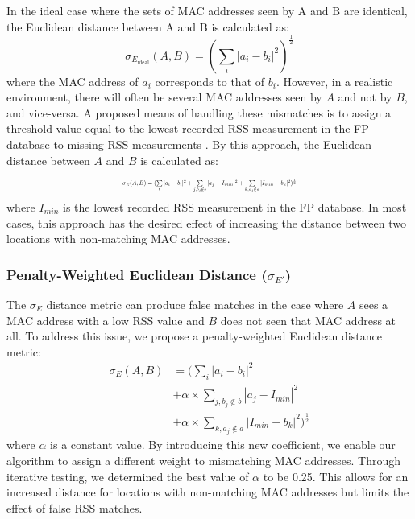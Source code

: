 \documentclass[conference]{IEEEtran}
\begin{document}
\indent In the ideal case where the sets of MAC addresses seen by A and B are identical, the Euclidean distance between A and B is calculated as:
\begin{equation}
\label{eq:euclidean_ideal}
\sigma_{E_{\text{ideal}}}(A, B) = (\sum\limits_{i}|a_i - b_i|^2)^\frac{1}{2}
\end{equation}
where the MAC address of $a_i$ corresponds to that of $b_i$. However, in a realistic environment, there will often be several MAC addresses seen by $A$ and not by $B$, and vice-versa. A proposed means of handling these mismatches is to assign a threshold value equal to the lowest recorded RSS measurement in the FP database to missing RSS measurements \cite{Kemppi}. By this approach, the Euclidean distance between $A$ and $B$ is calculated as:
\begin{equation}
\label{eq:euclidean}
\resizebox{0.45\textwidth}{!}{$\sigma_{E}(A, B)=(\sum\limits_{i}|a_i-b_i|^2+\sum\limits_{j, b_j\notin b}|a_j-I_{min}|^2+\sum\limits_{k, a_j\notin a}|I_{min}-b_k|^2)^\frac{1}{2}$}
\end{equation}
where $I_{min}$ is the lowest recorded RSS measurement in the FP database. In most cases, this approach has the desired effect of increasing the distance between two locations with non-matching MAC addresses.

\subsubsection{Penalty-Weighted Euclidean Distance ($\sigma_{E'}$)}
\indent The $\sigma_E$ distance metric can produce false matches in the case where $A$ sees a MAC address with a low RSS value and $B$ does not seen that MAC address at all. To address this issue, we propose a penalty-weighted Euclidean distance metric:
\begin{equation} \label{eq:penalty_weighted_euclidean}
\begin{split}
\sigma_{E}(A, B) & = (\sum\limits_{i}|a_i-b_i|^2 \\
			& +  \alpha\times\sum\limits_{j, b_j\notin b}|a_j-I_{min}|^2 \\
			& + \alpha\times\sum\limits_{k, a_j\notin a}|I_{min}-b_k|^2)^\frac{1}{2}
\end{split}
\end{equation}
where $\alpha$ is a constant value. By introducing this new coefficient, we enable our algorithm to assign a different weight to mismatching MAC addresses.  Through iterative testing, we determined the best value of $\alpha$ to be 0.25. This allows for an increased distance for locations with non-matching MAC addresses but limits the effect of false RSS matches.
	
\end{document}
